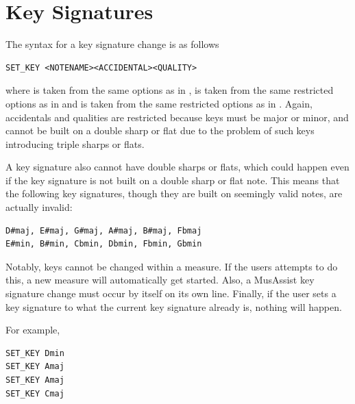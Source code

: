 \documentclass{report}
\newcommand\param[1]{\textttu{<#1>}}
\begin{document}
\section{Key Signatures}

The syntax for a key signature change is as follows

\begin{verbatim}
SET_KEY <NOTENAME><ACCIDENTAL><QUALITY>
\end{verbatim}

\noindent where \param{NOTENAME} is taken from the same options as in , \param{ACCIDENTAL} is taken from the same restricted options as in  and \param{QUALITY} is taken from the same restricted options as in . Again, accidentals and qualities are restricted because keys must be major or minor, and cannot be built on a double sharp or flat due to the problem of such keys introducing triple sharps or flats.

A key signature also cannot have double sharps or flats, which could happen even if the key signature is not built on a double sharp or flat note. This means that the following key signatures, though they are built on seemingly valid notes, are actually invalid:
\begin{verbatim}
D#maj, E#maj, G#maj, A#maj, B#maj, Fbmaj
E#min, B#min, Cbmin, Dbmin, Fbmin, Gbmin
\end{verbatim}


Notably, keys cannot be changed within a measure. If the users attempts to do this, a new measure will automatically get started. Also, a MusAssist key signature change must occur by itself on its own line. Finally, if the user sets a key signature to what the current key signature already is, nothing will happen. 

For example,
\begin{verbatim}
SET_KEY Dmin
SET_KEY Amaj
SET_KEY Amaj
SET_KEY Cmaj
\end{verbatim}
\end{document}
